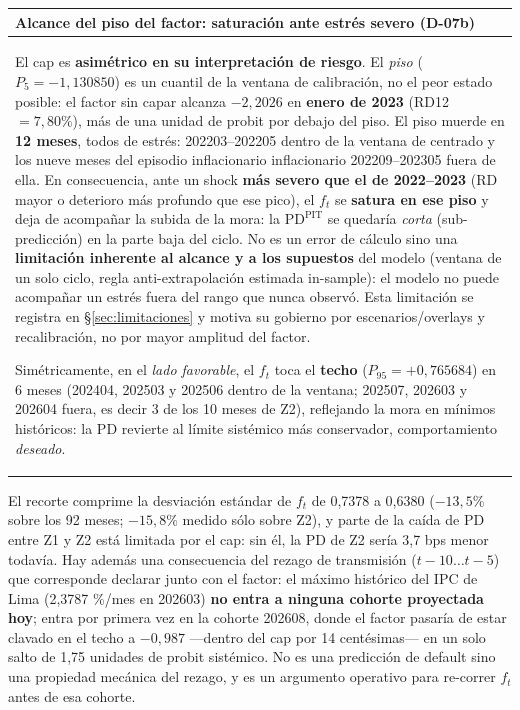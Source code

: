 \documentclass[12pt, a4paper]{article}
\newcommand{\PD}{\ensuremath{\mathrm{PD}}}
\newcommand{\PDPIT}{\ensuremath{\mathrm{PD}^{\mathrm{PIT}}}}
\newcommand{\ft}{\ensuremath{f_t}}
\newenvironment{recuadro}[1]
{\begin{center}\begin{tabular}{|p{0.92\textwidth}|}
\hline
\rowcolor{grissuave}
\textbf{#1} \\ \hline
}
{\\ \hline \end{tabular}\end{center}}
\begin{document}
\begin{recuadro}{Alcance del piso del factor: saturación ante estrés severo (D-07b)}
El cap es \textbf{asimétrico en su interpretación de riesgo}. El \emph{piso} ($P_5=-1{,}130850$) es
un cuantil de la ventana de calibración, no el peor estado posible: el factor sin capar alcanza
$-2{,}2026$ en \textbf{enero de 2023} (RD12~$=7{,}80\%$), más de una unidad de probit por debajo del
piso. El piso muerde en \textbf{12 meses}, todos de estrés: 202203--202205 dentro de la ventana de
centrado y los nueve meses del episodio inflacionario inflacionario 202209--202305 fuera de ella. En consecuencia,
ante un shock \textbf{más severo que el de 2022--2023} (RD mayor o deterioro más profundo que ese
pico), el $\ft$ se \textbf{satura en ese piso} y deja de acompañar la subida de la mora: la
\PDPIT{} se quedaría \emph{corta} (sub-predicción) en la parte baja del ciclo. No es un error de
cálculo sino una \textbf{limitación inherente al alcance y a los supuestos} del modelo (ventana de
un solo ciclo, regla anti-extrapolación estimada in-sample): el modelo no puede acompañar un
estrés fuera del rango que nunca observó. Esta limitación se registra en \S\ref{sec:limitaciones} y
motiva su gobierno por escenarios/overlays y recalibración, no por mayor amplitud del factor.

Simétricamente, en el \emph{lado favorable}, el $\ft$ toca el \textbf{techo} ($P_{95}=+0{,}765684$)
en 6 meses (202404, 202503 y 202506 dentro de la ventana; 202507, 202603 y 202604 fuera, es decir
3 de los 10 meses de Z2), reflejando la mora en mínimos históricos: la \PD{} revierte al límite
sistémico más conservador, comportamiento \emph{deseado}.
\end{recuadro}

El recorte comprime la desviación estándar de $\ft$ de 0,7378 a 0,6380 ($-13{,}5\%$ sobre los 92
meses; $-15{,}8\%$ medido sólo sobre Z2), y parte de la caída de \PD{} entre Z1 y Z2 está limitada
por el cap: sin él, la \PD{} de Z2 sería 3,7 bps menor todavía. Hay además una consecuencia del
rezago de transmisión ($t-10\ldots t-5$) que corresponde declarar junto con el factor: el máximo
histórico del IPC de Lima (2,3787 \%/mes en 202603) \textbf{no entra a ninguna cohorte proyectada
hoy}; entra por primera vez en la cohorte 202608, donde el factor pasaría de estar clavado en el
techo a $-0{,}987$ ---dentro del cap por 14 centésimas--- en un solo salto de 1,75 unidades de
probit sistémico. No es una predicción de default sino una propiedad mecánica del rezago, y es un
argumento operativo para re-correr $\ft$ antes de esa cohorte.
\end{document}
